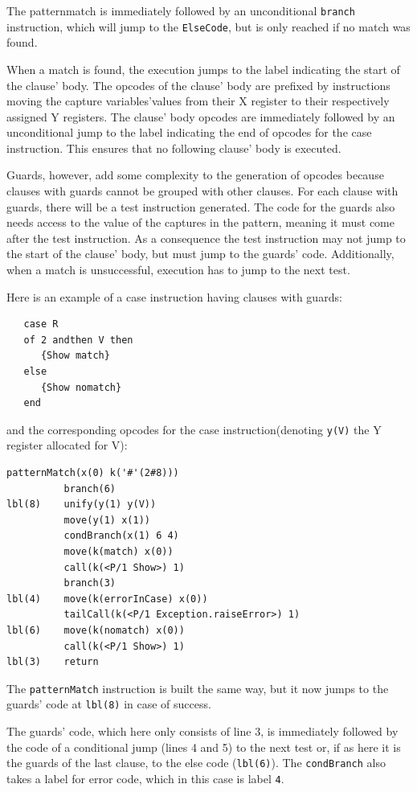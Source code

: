 \documentclass[a4paper]{memoir}
\begin{document}
The patternmatch is immediately followed by an unconditional \lstinline!branch! instruction,
which will jump to the \lstinline!ElseCode!, but is only reached if no match was found.

When a match is found, the execution jumps to the label indicating the start of the clause' body.
The opcodes of the clause' body are prefixed by instructions moving the capture
variables'values from their X register to their respectively assigned Y
registers.
The clause' body opcodes are immediately followed by an unconditional jump to
the label indicating the end of opcodes for the case instruction. This ensures
that no following clause' body is executed.

Guards, however, add some complexity to the generation of opcodes because clauses with guards cannot
be grouped with other clauses. For each clause with guards, there will be a
test instruction generated. The code for the guards also needs access
to the value of the captures in the pattern, meaning it must come after the
test instruction. As a consequence the test instruction may not jump to the start
of the clause' body, but must jump to the guards' code. Additionally, when a match
is unsuccessful, execution has to jump to the next test.

Here is an example of a case instruction having clauses with guards:
\begin{lstlisting}
   case R
   of 2 andthen V then
      {Show match}
   else
      {Show nomatch}
   end
\end{lstlisting}

and the corresponding opcodes for the case instruction(denoting \lstinline!y(V)! the Y register allocated for V):

\lstset{numbers=left, numberstyle=\tiny, stepnumber=1, numbersep=5pt}
\begin{lstlisting}[firstnumber=1]
          patternMatch(x(0) k('#'(2#8)))
          branch(6)
lbl(8)    unify(y(1) y(V))
          move(y(1) x(1))
          condBranch(x(1) 6 4)
          move(k(match) x(0))
          call(k(<P/1 Show>) 1)
          branch(3)
lbl(4)    move(k(errorInCase) x(0))
          tailCall(k(<P/1 Exception.raiseError>) 1)
lbl(6)    move(k(nomatch) x(0))
          call(k(<P/1 Show>) 1)
lbl(3)    return
\end{lstlisting}
\lstset{numbers=none}
The \lstinline!patternMatch! instruction is built the same way, but
it now jumps to the guards' code at \lstinline!lbl(8)! in case of
success. 

The guards' code, which here only consists of line 3, is immediately
followed by the code of a conditional jump (lines 4 and 5) to the next test or, if as here it is the guards
of the last clause, to the else code (\lstinline!lbl(6)!). The \lstinline!condBranch!
also takes a label for error code, which in this case is label \lstinline!4!.
\end{document}
